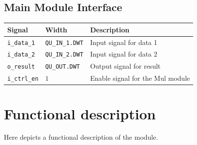 \documentclass[a4paper, oneside]{report}
\begin{document}
            \subsection{Main Module Interface}
                \begin{longtable}{lll}
                    \toprule
                    \textbf{Signal}      & \textbf{Width}    & \textbf{Description} \\
                    \midrule
                    \texttt{i\_data\_1}      & \texttt{QU\_IN\_1.DWT}         & Input signal for data 1 \\
                    \texttt{i\_data\_2}      & \texttt{QU\_IN\_2.DWT}        & Input signal for data 2 \\
                    \texttt{o\_result}    & \texttt{QU\_OUT.DWT}         & Output signal for result \\
                    \texttt{i\_ctrl\_en}     & $1$                 & Enable signal for the Mul module\\
                    \bottomrule
                \end{longtable}
        
        \section{Functional description}
        Here depicts a functional description of the module.
\end{document}
